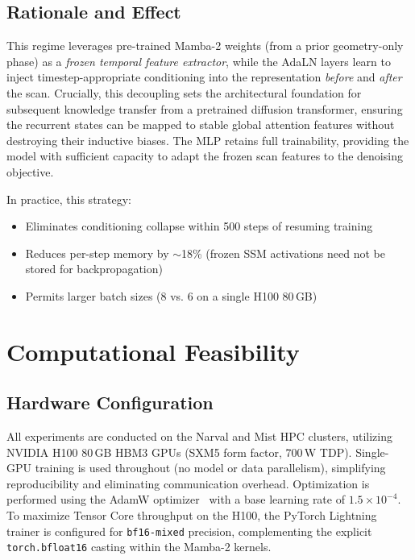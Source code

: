 \documentclass[12pt,letterpaper]{report}
\begin{document}
\subsection{Rationale and Effect}

This regime leverages pre-trained Mamba-2 weights (from a prior geometry-only
phase) as a \emph{frozen temporal feature extractor}, while the AdaLN layers
learn to inject timestep-appropriate conditioning into the representation
\emph{before} and \emph{after} the scan. Crucially, this decoupling sets the architectural foundation for subsequent knowledge transfer from a pretrained diffusion transformer, ensuring the recurrent states can be mapped to stable global attention features without destroying their inductive biases. The MLP retains full trainability,
providing the model with sufficient capacity to adapt the frozen scan features
to the denoising objective. %

In practice, this strategy:
\begin{itemize}
    \item Eliminates conditioning collapse within 500 steps of resuming training
    \item Reduces per-step memory by $\sim$18\% (frozen SSM activations need
        not be stored for backpropagation)
    \item Permits larger batch sizes (8 vs. 6 on a single H100 80\,GB)
\end{itemize}

\section{Computational Feasibility}\label{sec:feasibility}

\subsection{Hardware Configuration}

All experiments are conducted on the Narval and Mist HPC clusters, utilizing
NVIDIA H100 80\,GB HBM3 GPUs (SXM5 form factor, 700\,W TDP). Single-GPU
training is used throughout (no model or data parallelism), simplifying
reproducibility and eliminating communication overhead. Optimization is performed 
using the AdamW optimizer~\cite{loshchilov2019decoupled} with a base learning rate of $1.5 \times 10^{-4}$. 
To maximize Tensor Core throughput on the H100, the PyTorch Lightning trainer 
is configured for \texttt{bf16-mixed} precision, complementing the explicit 
\texttt{torch.bfloat16} casting within the Mamba-2 kernels. %
\end{document}
